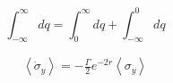 \documentclass[aps,showpacs,groupedaddress]{revtex4}
\begin{document}
\begin{widetext}
\begin{equation}
\int_{-\infty}^{\infty}dq=\int_{0}^{\infty}dq+\int_{-\infty}^{0}dq
\end{equation}
\end{widetext}


\begin{widetext}
\begin{equation}
\begin{split}
\left\langle\dot{\sigma}_{y}\right\rangle=-\frac{\Gamma}{2} e^{-2 r}\left\langle\sigma_{y}\right\rangle
\end{split}
\end{equation}
\end{widetext}
\end{document}

